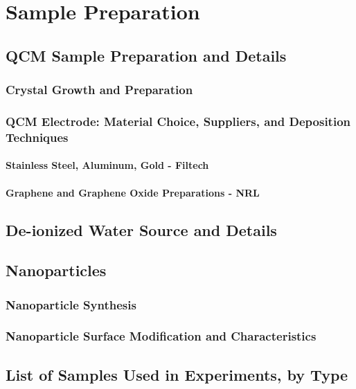\chapter{Sample Preparation}
\label{chap-four}

\section{QCM Sample Preparation and Details}

\subsection{Crystal Growth and Preparation}

\subsection{QCM Electrode: Material Choice, Suppliers, and Deposition Techniques}

\subsubsection{Stainless Steel, Aluminum, Gold - Filtech}

\subsubsection{Graphene and Graphene Oxide Preparations - NRL}


\section{De-ionized Water Source and Details}

\section{Nanoparticles}

\subsection{Nanoparticle Synthesis}

\subsection{Nanoparticle Surface Modification and Characteristics}

\section{List of Samples Used in Experiments, by Type}

